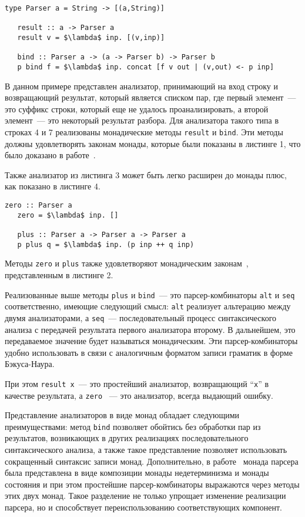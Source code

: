 \begin{lstlisting}[basicstyle=\small, caption=Парсеры как монады]
   type Parser a = String -> [(a,String)]

   result :: a -> Parser a
   result v = $\lambda$ inp. [(v,inp)]

   bind :: Parser a -> (a -> Parser b) -> Parser b
   p bind f = $\lambda$ inp. concat [f v out | (v,out) <- p inp]
\end{lstlisting}

В данном примере представлен анализатор, принимающий на вход строку и возвращающий результат, который является списком пар, где первый элемент~--- это суффикс строки, который еще не удалось проанализировать, а второй элемент~--- это некоторый результат разбора. Для анализатора такого типа в строках 4 и 7 реализованы монадические методы \lstinline|result| и \lstinline|bind|. Эти методы должны удовлетворять законам монады, которые были показаны в листинге 1, что было доказано в работе~\cite{wadler}.

Также анализатор из листинга 3 может быть легко расширен до монады плюс, как показано в листинге 4.

\begin{lstlisting}[basicstyle=\small, caption=Парсеры как монады плюс]
   zero :: Parser a
   zero = $\lambda$ inp. []

   plus :: Parser a -> Parser a -> Parser a
   p plus q = $\lambda$ inp. (p inp ++ q inp)
\end{lstlisting}

Методы \lstinline|zero| и \lstinline|plus| также удовлетворяют монадическим законам~\cite{wadler}, представленным в листинге 2.

Реализованные выше методы \lstinline|plus| и \lstinline|bind|~--- это парсер-комбинаторы \lstinline|alt| и \lstinline|seq| соответственно, имеющие следующий смысл: \lstinline|alt| реализует альтерацию между двумя анализаторами, а \lstinline|seq|~--- последовательный процесс синтаксического анализа с передачей результата первого анализатора второму. В дальнейшем, это передаваемое значение будет называться монадическим. Эти парсер-комбинаторы удобно использовать в связи с аналогичным форматом записи граматик в форме Бэкуса-Наура.

При этом \lstinline|result x|~--- это простейший анализатор, возвращающий ``\lstinline|x|'' в качестве результата, а \lstinline|zero| ~--- это анализатор, всегда выдающий ошибку.

Представление анализаторов в виде монад обладает следующими преимуществами: метод \lstinline|bind| позволяет обойтись без обработки пар из результатов, возникающих в других реализациях последовательного синтаксического анализа, а также такое представление позволяет использовать сокращенный синтаксис записи монад. Дополнительно, в работе~\cite{meijer} монада парсера была представлена в виде композиции монады недетерминизма и монады состояния и при этом простейшие парсер-комбинаторы выражаются через методы этих двух монад. Такое разделение не только упрощает изменение реализации парсера, но и способствует переиспользованию соответствующих компонент.

